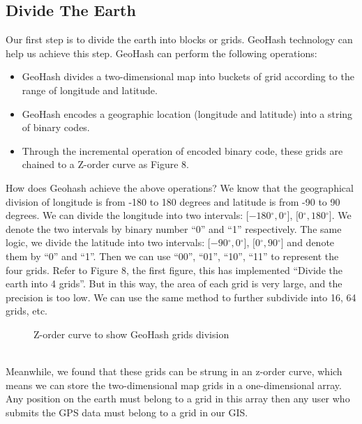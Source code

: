 \documentclass[sigplan,screen]{acmart}
\def\degree{${}^{\circ}$}
\begin{document}
\subsection{Divide The Earth}
Our first step is to divide the earth into blocks or grids. GeoHash technology can help us achieve this step.
GeoHash can perform the following operations:
\begin{itemize}
	\item GeoHash divides a two-dimensional map into buckets of grid according to the range of longitude and latitude.
	\item GeoHash encodes a geographic location (longitude and latitude) into a string of binary codes.
	\item Through the incremental operation of encoded binary code, these grids are chained to a Z-order curve as Figure 8.
\end{itemize}
How does Geohash achieve the above operations?
We know that the geographical division of longitude is from -180 to 180 degrees and latitude is from -90 to 90 degrees\cite{crossley1999guide}.
We can divide the longitude into two intervals: $[-180$\degree$, 0$\degree$]$, $[0$\degree$, 180$\degree$]$.
We denote the two intervals by binary number ``0'' and ``1'' respectively.
The same logic, we divide the latitude into two intervals: $[-90$\degree$, 0$\degree$]$, $[0$\degree$, 90$\degree$]$ and denote them by ``0'' and ``1''.
Then we can use ``00'', ``01'', ``10'', ``11'' to represent the four grids.
Refer to Figure 8, the first figure, this has implemented ``Divide the earth into 4 grids''.
But in this way, the area of each grid is very large, and the precision is too low.
We can use the same method to further subdivide into 16, 64 grids, etc.
\begin{figure}[htb]
	\centering
	\caption{Z-order curve to show GeoHash grids division}
\end{figure}
\\
Meanwhile, we found that these grids can be strung in an z-order curve, which means we can store the two-dimensional map grids in a one-dimensional array.
Any position on the earth must belong to a grid in this array then any user who submits the GPS data must belong to a grid in our GIS.
\end{document}
